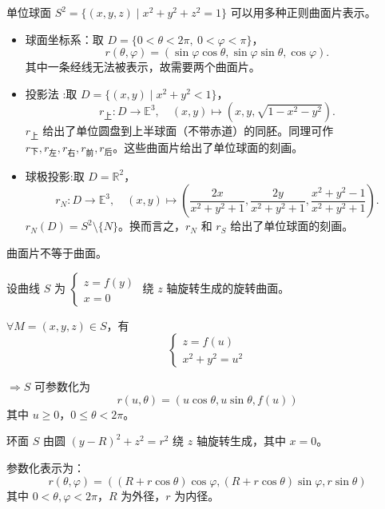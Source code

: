 \documentclass[lang=cn,10pt,thmcnt=section]{elegantbook}
\begin{document}
\begin{example}[单位球面]
    单位球面 $S^2 = \{(x, y, z) \mid x^2 + y^2 + z^2 = 1\}$ 可以用多种正则曲面片表示。
   
    \begin{itemize}
        \item 球面坐标系：取 $D = \{0 < \theta < 2\pi, \ 0 < \varphi < \pi\}$，
        $$
        r(\theta, \varphi) = (\sin\varphi \cos\theta, \sin\varphi \sin\theta, \cos\varphi).
        $$
        其中一条经线无法被表示，故需要两个曲面片。
        \item 投影法 :取 $D = \{(x, y) \mid x^2 + y^2 < 1\}$，
        $$
        r_{\text{上}}: D \rightarrow \mathbb{E}^3, \quad (x, y) \mapsto \left(x, y, \sqrt{1 - x^2 - y^2}\right).
        $$
        $r_{\text{上}}$ 给出了单位圆盘到上半球面（不带赤道）的同胚。同理可作 $r_{\text{下}}, r_{\text{左}}, r_{\text{右}}, r_{\text{前}}, r_{\text{后}}$。这些曲面片给出了单位球面的刻画。
        
        \item 球极投影:取 $D = \mathbb{R}^2$，
        $$
        r_N: D \rightarrow \mathbb{E}^3, \quad (x, y) \mapsto \left(\frac{2x}{x^2 + y^2 + 1}, \frac{2y}{x^2 + y^2 + 1}, \frac{x^2 + y^2 - 1}{x^2 + y^2 + 1}\right).
        $$
        $r_N(D) = S^2 \setminus \{N\}$。换而言之，$r_N$ 和 $r_S$ 给出了单位球面的刻画。
    \end{itemize}
    
    \begin{remark}
        曲面片不等于曲面。
    \end{remark}
\end{example}
\begin{example}[旋转曲面]
    设曲线 $S$ 为 $\begin{cases} z = f(y) \\ x = 0 \end{cases}$ 绕 $z$ 轴旋转生成的旋转曲面。
    
    $\forall M = (x, y, z) \in S$，有
    $$
    \begin{cases}
    z = f(u) \\
    x^2 + y^2 = u^2
    \end{cases}
    $$
    
    $\Rightarrow S$ 可参数化为
    $$
    r(u, \theta) = (u \cos \theta, u \sin \theta, f(u))
    $$
    其中 $u \geq 0$，$0 \leq \theta < 2\pi$。
    

    
    \end{example}
    \begin{example}[环面]
        环面 $S$ 由圆 $(y - R)^2 + z^2 = r^2$ 绕 $z$ 轴旋转生成，其中 $x = 0$。
        
        参数化表示为：
        $$
        r(\theta, \varphi) = ((R + r \cos \theta) \cos \varphi, (R + r \cos \theta) \sin \varphi, r \sin \theta)
        $$
        其中 $0 < \theta, \varphi < 2\pi$，$R$ 为外径，$r$ 为内径。
        
   
        
\end{example}
\end{document}
